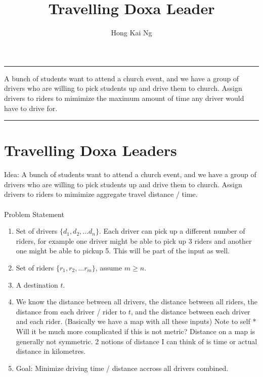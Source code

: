 \documentclass[12pt, oneside]{article}
\title{Travelling Doxa Leader} %
\author{Hong Kai Ng} %
\date{} %
\begin{document}
\maketitle

\hrule
\vspace{20pt}
\noindent A bunch of students want to attend a church event, and we have a group of drivers who are willing to pick students up and drive them to church. Assign drivers to riders to mimimize the maximum amount of time any driver would have to drive for. 

\vspace{20pt}
\hrule


\section{Travelling Doxa Leaders}
Idea: A bunch of students want to attend a church event, and we have a group of drivers who are willing to pick students up and drive them to church. Assign drivers to riders to mimimize aggregate travel distance / time. \\\\
Problem Statement
\begin{enumerate}
  \item Set of drivers $\{d_1, d_2, ... d_n\}$. Each driver can pick up a different number of riders, for example one driver might be able to pick up 3 riders and another one might be able to pickup 5. This will be part of the input as well. 
  \item Set of riders $\{r_1, r_2, ... r_m\}$, assume $m \geq n$. 
  \item A destination $t$. 
  \item We know the distance between all drivers, the distance between all riders, the distance from each driver / rider to $t$, and the distance between each driver and each rider. (Basically we have a map with all these inputs) Note to self * Will it be much more complicated if this is not metric? Distance on a map is generally not symmetric. 2 notions of distance I can think of is time or actual distance in kilometres. 
  \item Goal: Minimize driving time / distance accross all drivers combined. 
\end{enumerate}
\end{document}
